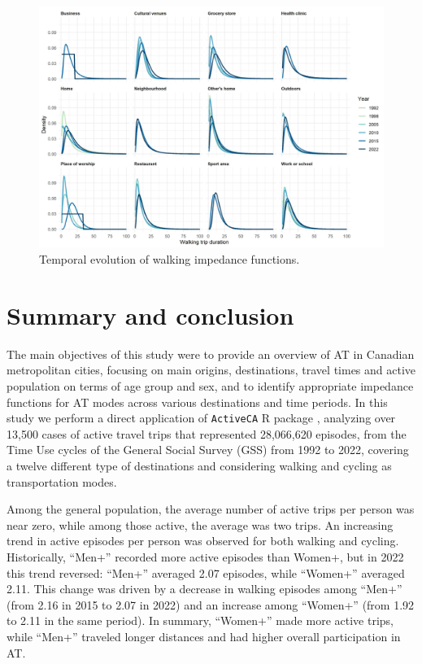 \documentclass[preprint, 3p,
authoryear]{elsarticle} %
\begin{document}
\begin{figure}

{\centering \includegraphics[width=1\linewidth]{figures/walking_temporal_evolution} 

}

\caption{Temporal evolution of walking impedance functions.}\label{fig:walking-evolution-fig}
\end{figure}

\section{Summary and conclusion}\label{summary-and-conclusion}

The main objectives of this study were to provide an overview of AT in
Canadian metropolitan cities, focusing on main origins, destinations,
travel times and active population on terms of age group and sex, and to
identify appropriate impedance functions for AT modes across various
destinations and time periods. In this study we perform a direct
application of \texttt{ActiveCA} R package \citep{dossantos2025},
analyzing over 13,500 cases of active travel trips that represented
28,066,620 episodes, from the Time Use cycles of the General Social
Survey (GSS) from 1992 to 2022, covering a twelve different type of
destinations and considering walking and cycling as transportation
modes.

Among the general population, the average number of active trips per
person was near zero, while among those active, the average was two
trips. An increasing trend in active episodes per person was observed
for both walking and cycling. Historically, ``Men+'' recorded more
active episodes than Women+, but in 2022 this trend reversed: ``Men+''
averaged 2.07 episodes, while ``Women+'' averaged 2.11. This change was
driven by a decrease in walking episodes among ``Men+'' (from 2.16 in
2015 to 2.07 in 2022) and an increase among ``Women+'' (from 1.92 to
2.11 in the same period). In summary, ``Women+'' made more active trips,
while ``Men+'' traveled longer distances and had higher overall
participation in AT.
\end{document}
